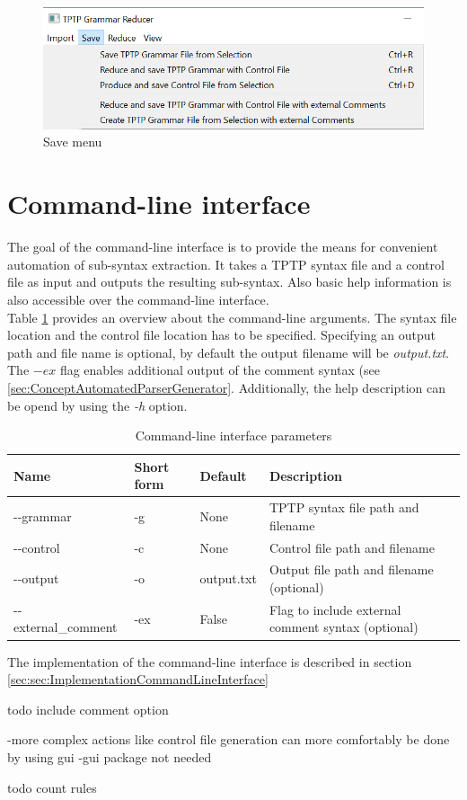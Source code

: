 \begin{figure}[H]
\centering
\includegraphics[width=1\textwidth]{images/save.png}
\caption{Save menu}
\label{fig:save}
\end{figure}

\section{Command-line interface}\label{sec:ConceptCommandLineInterface}
The goal of the command-line interface is to provide the means for convenient automation of sub-syntax extraction.
It takes a \ac{TPTP} syntax file and a control file as input and outputs the resulting sub-syntax.
Also basic help information is also accessible over the command-line interface.\\
Table \ref{tbl:ImplementationCommandLineParameters} provides an overview about the command-line arguments.
The syntax file location and the control file location has to be specified.
Specifying an output path and file name is optional, by default the output filename will be \textit{output.txt}.
The $-ex$ flag enables additional output of the comment syntax (see \ref{sec:ConceptAutomatedParserGenerator}.
Additionally, the help description can be opend by using the \textit{-h} option.
\begin{table}[H]
\centering
\caption{Command-line interface parameters}
\begin{adjustbox}{width=1\textwidth, center=\textwidth}
\renewcommand{\arraystretch}{2}
\begin{tabular}{llll}
\textbf{Name} & \textbf{Short form} & \textbf{Default} & \textbf{Description}\\\hline
-{}-grammar & -g & None & \ac{TPTP} syntax file path and filename\\
-{}-control & -c & None &  Control file path and filename\\
-{}-output & -o & output.txt & Output file path and filename (optional)\\
-{}-external\_comment & -ex & False & Flag to include external comment syntax (optional)
\end{tabular}
\end{adjustbox}
\label{tbl:ImplementationCommandLineParameters}
\end{table}

The implementation of the command-line interface is described in section \ref{sec:sec:ImplementationCommandLineInterface}

todo include comment option

 
-more complex actions like control file generation can more comfortably be done by using gui
-gui package not needed

todo count rules